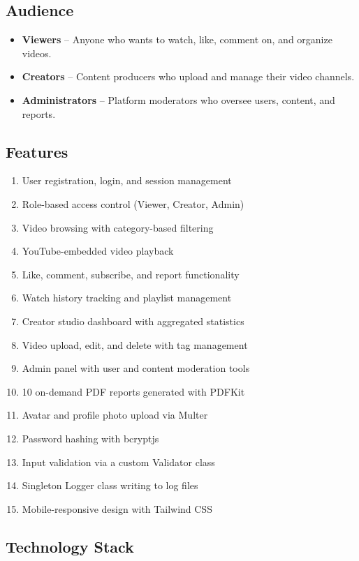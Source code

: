 \documentclass[a4paper, twoside]{article}
\begin{document}
\subsection{Audience}
\begin{itemize}
    \item \textbf{Viewers} -- Anyone who wants to watch, like, comment on, and organize videos.
    \item \textbf{Creators} -- Content producers who upload and manage their video channels.
    \item \textbf{Administrators} -- Platform moderators who oversee users, content, and reports.
\end{itemize}

\subsection{Features}

\begin{enumerate}
    \item User registration, login, and session management
    \item Role-based access control (Viewer, Creator, Admin)
    \item Video browsing with category-based filtering
    \item YouTube-embedded video playback
    \item Like, comment, subscribe, and report functionality
    \item Watch history tracking and playlist management
    \item Creator studio dashboard with aggregated statistics
    \item Video upload, edit, and delete with tag management
    \item Admin panel with user and content moderation tools
    \item 10 on-demand PDF reports generated with PDFKit
    \item Avatar and profile photo upload via Multer
    \item Password hashing with bcryptjs
    \item Input validation via a custom Validator class
    \item Singleton Logger class writing to log files
    \item Mobile-responsive design with Tailwind CSS
\end{enumerate}

\subsection{Technology Stack}
\end{document}
